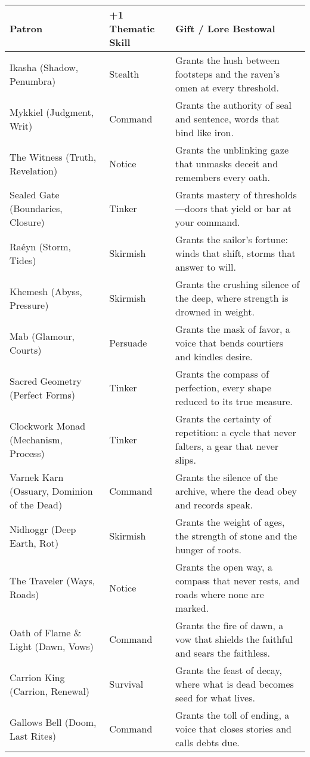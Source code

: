 \begin{table}[H]
\centering
\renewcommand{\arraystretch}{1.15}
\begin{tabular}{@{}p{3.8cm}p{3.8cm}p{7.5cm}@{}}
\toprule
\textbf{Patron} & \textbf{+1 Thematic Skill} & \textbf{Gift / Lore Bestowal} \\
\midrule
Ikasha (Shadow, Penumbra) & Stealth & Grants the hush between footsteps and the raven’s omen at every threshold. \\
Mykkiel (Judgment, Writ) & Command & Grants the authority of seal and sentence, words that bind like iron. \\
The Witness (Truth, Revelation) & Notice & Grants the unblinking gaze that unmasks deceit and remembers every oath. \\
Sealed Gate (Boundaries, Closure) & Tinker & Grants mastery of thresholds—doors that yield or bar at your command. \\
Raéyn (Storm, Tides) & Skirmish & Grants the sailor’s fortune: winds that shift, storms that answer to will. \\
Khemesh (Abyss, Pressure) & Skirmish & Grants the crushing silence of the deep, where strength is drowned in weight. \\
Mab (Glamour, Courts) & Persuade & Grants the mask of favor, a voice that bends courtiers and kindles desire. \\
Sacred Geometry (Perfect Forms) & Tinker & Grants the compass of perfection, every shape reduced to its true measure. \\
Clockwork Monad (Mechanism, Process) & Tinker & Grants the certainty of repetition: a cycle that never falters, a gear that never slips. \\
Varnek Karn (Ossuary, Dominion of the Dead) & Command & Grants the silence of the archive, where the dead obey and records speak. \\
Nidhoggr (Deep Earth, Rot) & Skirmish & Grants the weight of ages, the strength of stone and the hunger of roots. \\
The Traveler (Ways, Roads) & Notice & Grants the open way, a compass that never rests, and roads where none are marked. \\
Oath of Flame \& Light (Dawn, Vows) & Command & Grants the fire of dawn, a vow that shields the faithful and sears the faithless. \\
Carrion King (Carrion, Renewal) & Survival & Grants the feast of decay, where what is dead becomes seed for what lives. \\
Gallows Bell (Doom, Last Rites) & Command & Grants the toll of ending, a voice that closes stories and calls debts due. \\

\end{tabular}
\end{table}

